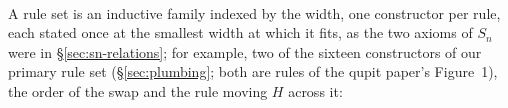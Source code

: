 \noindent\begin{minipage}[c]{0.56\textwidth}
\begin{code}%
\>[0]\AgdaSpace{}%
\AgdaSymbol{:}\AgdaSpace{}%
\AgdaSpace{}%
\AgdaSymbol{(}\AgdaSpace{}%
\AgdaSymbol{(}\AgdaSpace{}%
\AgdaSymbol{))}\<%
\\
\>[0]\AgdaSpace{}%
\AgdaSymbol{=}\AgdaSpace{}%
\AgdaSpace{}%
\AgdaSpace{}%
\AgdaSpace{}%
\AgdaSpace{}%
\AgdaSpace{}%
\AgdaSpace{}%
\AgdaSpace{}%
\AgdaSpace{}%
\AgdaSpace{}%
\AgdaSpace{}%
\AgdaSpace{}%
\AgdaSpace{}%
\AgdaSpace{}%
\AgdaSpace{}%
\AgdaSpace{}%
\AgdaSpace{}%
\AgdaSpace{}%
\AgdaSpace{}%
\AgdaSpace{}%
\AgdaSpace{}%
\AgdaSpace{}%
\AgdaSpace{}%
\<%
\end{code}
\end{minipage}\hfill
\begin{minipage}[c]{0.42\textwidth}\centering
{}
\end{minipage}

\noindent A rule set is an inductive family indexed by the width, one
constructor per rule, each stated once at the smallest width at which
it fits, as the two axioms of $S_n$ were in \S\ref{sec:sn-relations};
for example, two of the sixteen constructors of our primary rule set
 (\S\ref{sec:plumbing}; both are rules of
the qupit paper's Figure~1), the order of the swap and the rule moving
$H$ across it:

